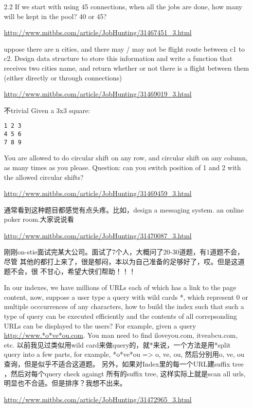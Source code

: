 \documentclass[12pt]{book}
\begin{document}
2.2 If we start with using 45 connections, when all the jobs are done, how 
many will be kept in the pool? 40 or 45?

\url{http://www.mitbbs.com/article/JobHunting/31467451_3.html}

uppose there are n cities, and there may / may not be flight route
between c1 to c2. Design data structure to store this information and
write a function that receives two cities name, and return whether or
not there is a flight between them (either directly or through connections)

\url{http://www.mitbbs.com/article/JobHunting/31469019_3.html}

不trivial
Given a 3x3 square:
\lstset{language=java,label= ,caption= ,numbers=none}
\begin{lstlisting}
1 2 3
4 5 6
7 8 9
\end{lstlisting}
You are allowed to do circular shift on any row, and
circular shift on any column, as many times as you
please. Question: can you switch position of 1 and 2 with
the allowed circular shifts?

\url{http://www.mitbbs.com/article/JobHunting/31469459_3.html}

通常看到这种题目都感觉有点头疼。比如，design a messaging system. an online 
poker room.大家说说看

\url{http://www.mitbbs.com/article/JobHunting/31470087_3.html}

刚刚on-stie面试完某大公司。面试了7个人，大概问了20-30道题，有1道题不会，尽管
其他的都打上来了，很是郁闷，本以为自己准备的足够好了，哎。但是这道题不会，很
不甘心，希望大侠们帮助！！！

In our indexes, we have millions of URLs each of which has a link to the 
page content, now, suppose a user type a query with wild cards *, which 
represent 0 or multiple occcurrences of any characters, how to build the 
index such that such a type of query can be executed efficiently and the 
contents of all correpsonding URLs can be displayed to the users? For 
example, given a query \url{http://www.*o*ve*ou.com}. You man need to find iloveyou.com, itveabcu.com, etc. 
以前我见过类似用wild card来做query的，就*来说，一个方法是用*split
query into a few parts, for example, *o*ve*ou => o, ve, ou, 然后分别用o, ve, ou 查询，但是似乎不适合这道题。 另外，如果对Index里的每一个URL建suffix tree ，然后对每个query check againgt 所有的suffix tree, 这样实际上就是scan all urls, 明显也不合适。但是排序？我想不出来。

\url{http://www.mitbbs.com/article/JobHunting/31472965_3.html}
\end{document}
